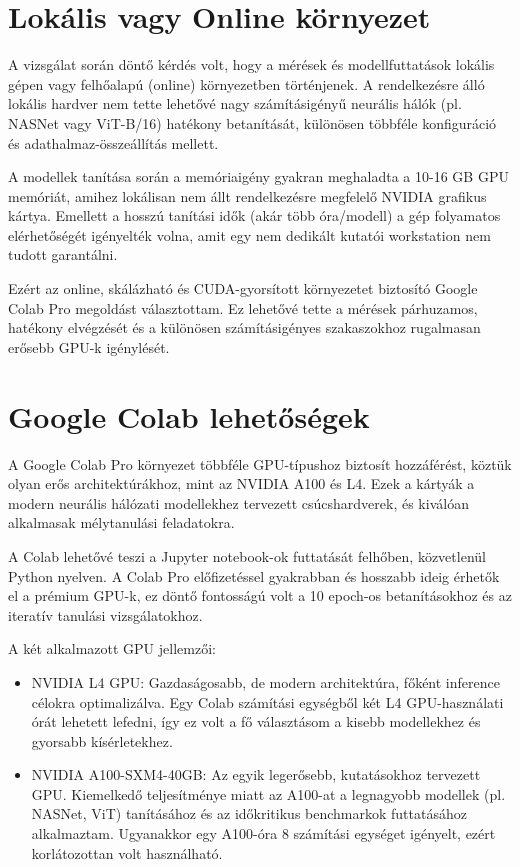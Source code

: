     \section{Lokális vagy Online környezet}
        A vizsgálat során döntő kérdés volt, hogy a mérések és modellfuttatások lokális gépen vagy felhőalapú (online) környezetben történjenek. A rendelkezésre álló lokális hardver nem tette lehetővé nagy számításigényű neurális hálók (pl. NASNet vagy ViT-B/16) hatékony betanítását, különösen többféle konfiguráció és adathalmaz-összeállítás mellett.

        A modellek tanítása során a memóriaigény gyakran meghaladta a 10-16 GB GPU memóriát, amihez lokálisan nem állt rendelkezésre megfelelő NVIDIA grafikus kártya. Emellett a hosszú tanítási idők (akár több óra/modell) a gép folyamatos elérhetőségét igényelték volna, amit egy nem dedikált kutatói workstation nem tudott garantálni.
        
        Ezért az online, skálázható és CUDA-gyorsított környezetet biztosító Google Colab Pro megoldást választottam. Ez lehetővé tette a mérések párhuzamos, hatékony elvégzését és a különösen számításigényes szakaszokhoz rugalmasan erősebb GPU-k igénylését.

    \section{Google Colab lehetőségek}
        A Google Colab Pro környezet többféle GPU-típushoz biztosít hozzáférést, köztük olyan erős architektúrákhoz, mint az NVIDIA A100 és L4. Ezek a kártyák a modern neurális hálózati modellekhez tervezett csúcshardverek, és kiválóan alkalmasak mélytanulási feladatokra.

        A Colab lehetővé teszi a Jupyter notebook-ok futtatását felhőben, közvetlenül Python nyelven. A Colab Pro előfizetéssel gyakrabban és hosszabb ideig érhetők el a prémium GPU-k, ez döntő fontosságú volt a 10 epoch-os betanításokhoz és az iteratív tanulási vizsgálatokhoz.
        
        A két alkalmazott GPU jellemzői:
            \begin{itemize}          
            \item NVIDIA L4 GPU: Gazdaságosabb, de modern architektúra, főként inference célokra optimalizálva. Egy Colab számítási egységből két L4 GPU-használati órát lehetett lefedni, így ez volt a fő választásom a kisebb modellekhez és gyorsabb kísérletekhez.
        
            \item NVIDIA A100-SXM4-40GB: Az egyik legerősebb, kutatásokhoz tervezett GPU. Kiemelkedő teljesítménye miatt az A100-at a legnagyobb modellek (pl. NASNet, ViT) tanításához és az időkritikus benchmarkok futtatásához alkalmaztam. Ugyanakkor egy A100-óra 8 számítási egységet igényelt, ezért korlátozottan volt használható.
            \end{itemize}
        
